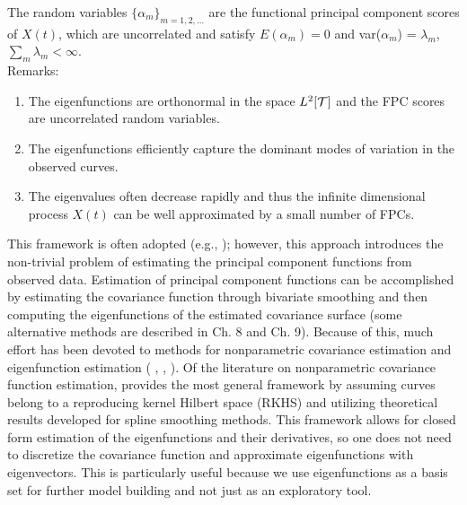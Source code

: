 The random variables $\{\alpha_m \}_{m=1,2,\ldots}$ are the functional principal component scores of $X(t)$, which are uncorrelated and satisfy $E(\alpha_m)=0$ and var($\alpha_m$) = $\lambda_m$, $\sum_m \lambda_m < \infty$.\\
Remarks:
\begin{enumerate}
	\item The eigenfunctions are orthonormal in the space $L^2[\mathcal{T}]$ and the FPC scores are uncorrelated random variables.
	\item The eigenfunctions efficiently capture the dominant modes of variation in the observed curves.
	\item The eigenvalues often decrease rapidly and thus the infinite dimensional process $X(t)$ can be well approximated by a small number of FPCs.
\end{enumerate}

This framework is often adopted (e.g., \cite{Yao:2005cv,Di:2009dz,Gromenko:2012ij}); however, 
this approach introduces the non-trivial problem of estimating the principal component functions from observed data. Estimation of principal component functions can be accomplished by estimating the covariance function through bivariate smoothing and then computing the eigenfunctions of the estimated covariance surface (some alternative methods are described in \cite{FDA} Ch. 8 and Ch. 9). Because of this, much effort has been devoted to methods for nonparametric covariance estimation and eigenfunction estimation ( \cite{Yao:2005cv}, \cite{Li:2007dn}, \cite{Cai:2010vr}).  Of the literature on nonparametric covariance function estimation, \cite{Cai:2010vr} provides the most general framework by assuming curves belong to a reproducing kernel Hilbert space (RKHS) and utilizing theoretical results developed for spline smoothing methods. This framework allows for closed form estimation of the eigenfunctions and their derivatives, so one does not need to discretize the covariance function and approximate eigenfunctions with eigenvectors.  This is particularly useful because we use eigenfunctions as a basis set for further model building and not just as an exploratory tool. 

